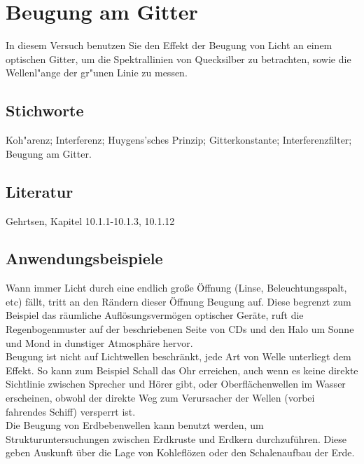 \chapter{Beugung am Gitter}
\label{v:10}

In diesem Versuch benutzen Sie den Effekt der Beugung von Licht an einem optischen Gitter, um die Spektrallinien von Quecksilber zu betrachten, sowie die Wellenl"ange der gr"unen Linie zu messen.\\

\section{Stichworte}

Koh"arenz; Interferenz; Huygens'sches Prinzip; Gitterkonstante; Interferenzfilter; Beugung am Gitter.
%
\section{Literatur}

Gehrtsen, Kapitel 10.1.1-10.1.3, 10.1.12
%

\section{Anwendungsbeispiele}

Wann immer Licht durch eine endlich große Öffnung (Linse, Beleuchtungsspalt, etc) fällt, tritt an den Rändern dieser Öffnung Beugung auf. Diese begrenzt zum Beispiel das räumliche Auflösungsvermögen optischer Geräte, ruft die Regenbogenmuster auf der beschriebenen Seite von CDs und den Halo um Sonne und Mond in dunstiger Atmosphäre hervor.\\
Beugung ist nicht auf Lichtwellen beschränkt, jede Art von Welle unterliegt dem Effekt. So kann zum Beispiel Schall das Ohr erreichen, auch wenn es keine direkte Sichtlinie zwischen Sprecher und Hörer gibt, oder Oberflächenwellen im Wasser erscheinen, obwohl der direkte Weg zum Verursacher der Wellen (vorbei fahrendes Schiff) versperrt ist.\\
Die Beugung von Erdbebenwellen kann benutzt werden, um Strukturuntersuchungen zwischen Erdkruste und Erdkern durchzuführen. Diese geben Auskunft über die Lage von Kohleflözen oder den Schalenaufbau der Erde.

